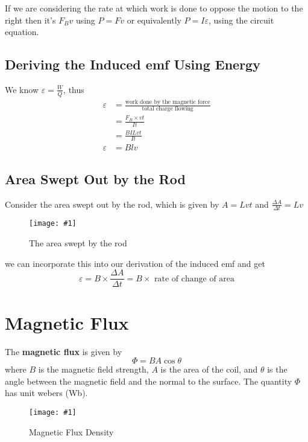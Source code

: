 \documentclass[a4paper,12pt]{article}
\let\oldsection\section
\renewcommand\section{\clearpage\oldsection}
\newcommand{\img}[4]{\begin{center}
  \begin{figure}[H]
    \centering
    \texttt{[image: \#1]}
    \caption{#3}
    \label{fig:#4}
  \end{figure}
\end{center}}
\begin{document}
If we are considering the rate at which work is done to oppose the motion to the right then it's $F_Bv$ using $P = Fv$ or equivalently $P = I\varepsilon$, using the circuit equation.

\subsection{Deriving the Induced emf Using Energy}

We know $\varepsilon = \frac{W}{Q}$, thus
\bgroup
\addtolength{\jot}{1em}
\begin{align*}
  \varepsilon & = \frac{\text{work done by the magnetic force}}{\text{total charge flowing}} \\
              & = \frac{F_B\times vt}{It}                                                    \\
              & = \frac{BILvt}{It}                                                           \\
  \varepsilon & = Blv
\end{align*}
\egroup

\subsection{Area Swept Out by the Rod}

Consider the area swept out by the rod, which is given by $A = Lvt$ and $\frac{\Delta A}{\Delta t} = Lv$

\img{rollingarea.png}{0.6}{The area swept by the rod}{rollingarea}
we can incorporate this into our derivation of the induced emf and get
\begin{equation}\label{eq:emf_area}
  \varepsilon = B\times \frac{\Delta A}{\Delta t} = B \times \text{ rate of change of area}
\end{equation}

\pagebreak

\section{Magnetic Flux}

The \textbf{magnetic flux} is given by $$\Phi = BA\cos\theta$$where $B$ is the magnetic field strength, $A$ is the area of the coil, and $\theta$ is the angle between the magnetic field and the normal to the surface. The quantity $\Phi$ has unit webers (Wb).

\img{fluxdensity.png}{1}{Magnetic Flux Density}{fluxdensity}
\end{document}
